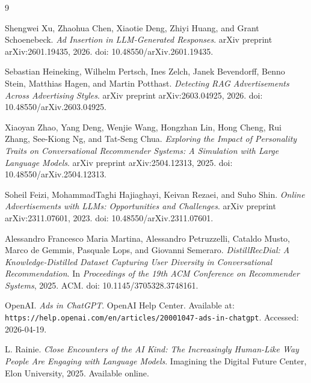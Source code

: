 \documentclass{article}
\begin{document}
\newpage

\begin{thebibliography}{9}

Shengwei Xu, Zhaohua Chen, Xiaotie Deng, Zhiyi Huang, and Grant Schoenebeck.
\textit{Ad Insertion in LLM-Generated Responses}.
arXiv preprint arXiv:2601.19435, 2026.
doi: 10.48550/arXiv.2601.19435.

Sebastian Heineking, Wilhelm Pertsch, Ines Zelch, Janek Bevendorff, Benno Stein, Matthias Hagen, and Martin Potthast.
\textit{Detecting RAG Advertisements Across Advertising Styles}.
arXiv preprint arXiv:2603.04925, 2026.
doi: 10.48550/arXiv.2603.04925.

Xiaoyan Zhao, Yang Deng, Wenjie Wang, Hongzhan Lin, Hong Cheng, Rui Zhang, See-Kiong Ng, and Tat-Seng Chua.
\textit{Exploring the Impact of Personality Traits on Conversational Recommender Systems: A Simulation with Large Language Models}.
arXiv preprint arXiv:2504.12313, 2025.
doi: 10.48550/arXiv.2504.12313.

Soheil Feizi, MohammadTaghi Hajiaghayi, Keivan Rezaei, and Suho Shin.
\textit{Online Advertisements with LLMs: Opportunities and Challenges}.
arXiv preprint arXiv:2311.07601, 2023.
doi: 10.48550/arXiv.2311.07601.

Alessandro Francesco Maria Martina, Alessandro Petruzzelli, Cataldo Musto, Marco de Gemmis, Pasquale Lops, and Giovanni Semeraro.
\textit{DistillRecDial: A Knowledge-Distilled Dataset Capturing User Diversity in Conversational Recommendation}.
In \textit{Proceedings of the 19th ACM Conference on Recommender Systems}, 2025.
ACM.
doi: 10.1145/3705328.3748161.

OpenAI. \emph{Ads in ChatGPT}. OpenAI Help Center. Available at:
\texttt{https://help.openai.com/en/articles/20001047-ads-in-chatgpt}.
Accessed: 2026-04-19.

L. Rainie.
\newblock \textit{Close Encounters of the AI Kind: The Increasingly Human-Like Way People Are Engaging with Language Models}.
\newblock Imagining the Digital Future Center, Elon University, 2025.
\newblock Available online.

\end{thebibliography}
\end{document}
